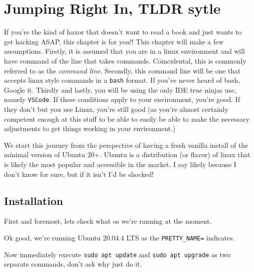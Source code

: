 \chapter{Jumping Right In, TLDR sytle}
If you're the kind of haxor that doesn't want to read a book and just wants to get hacking ASAP, this chapter is for you!! This chapter will make a few assumptions. Firstly, it is assumed that you are in a linux environment and will have command of the line that takes commands. Coincidental, this is commonly referred to as the \emph{command line}. Secondly, this command line will be one that accepts linux style commands in a \texttt{bash} format. If you've never heard of bash, Google it. Thirdly and lastly, you will be using the only IDE true ninjas use, namely \texttt{VSCode}. If these conditions apply to your environment, you're good. If they don't but you use Linux, you're still good (as you're almost certainly competent enough at this stuff to be able to easily be able to make the necessary adjustments to get things working in your environment.)

We start this journey from the perspective of having a fresh vanilla install of the minimal version of Ubuntu 20+. Ubuntu is a distribution (or flavor) of linux that is likely the most popular and accessible in the market. I say likely because I don't know for sure, but if it isn't I'd be shocked!

\section{Installation}
First and foremost, lets check what os we're running at the moment.
\par
{}
Ok good, we're running Ubuntu 20.04.4 LTS as the \texttt{PRETTY\_NAME=} indicates.

Now immediately execute \texttt{sudo apt update} and \texttt{sudo apt upgrade} as two separate commands, don't ask why just do it.

